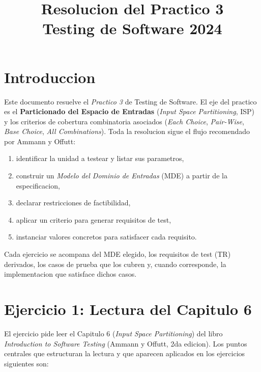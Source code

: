 \documentclass[12pt,a4paper]{article}
\title{\textbf{Resolucion del Practico 3}\\Testing de Software 2024}
\author{}
\date{}
\begin{document}
\maketitle
\tableofcontents
\newpage

\section*{Introduccion}

Este documento resuelve el \textit{Practico 3} de Testing de Software. El eje del practico es el
\textbf{Particionado del Espacio de Entradas} (\textit{Input Space Partitioning}, ISP) y los
criterios de cobertura combinatoria asociados (\textit{Each Choice}, \textit{Pair-Wise},
\textit{Base Choice}, \textit{All Combinations}). Toda la resolucion sigue el flujo recomendado por
Ammann y Offutt:

\begin{enumerate}
  \item identificar la unidad a testear y listar sus parametros,
  \item construir un \textit{Modelo del Dominio de Entradas} (MDE) a partir de la especificacion,
  \item declarar restricciones de factibilidad,
  \item aplicar un criterio para generar requisitos de test,
  \item instanciar valores concretos para satisfacer cada requisito.
\end{enumerate}

Cada ejercicio se acompana del MDE elegido, los requisitos de test (TR) derivados, los casos de
prueba que los cubren y, cuando corresponde, la implementacion que satisface dichos casos.

\section{Ejercicio 1: Lectura del Capitulo 6}

El ejercicio pide leer el Capitulo 6 (\textit{Input Space Partitioning}) del libro
\textit{Introduction to Software Testing} (Ammann y Offutt, 2da edicion). Los puntos centrales que
estructuran la lectura y que aparecen aplicados en los ejercicios siguientes son:
\end{document}
